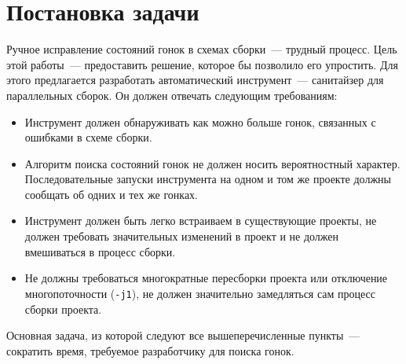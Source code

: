 \section{Постановка задачи}
\label{sec:Chapter1} 


Ручное исправление состояний гонок в схемах сборки~--- трудный процесс. Цель этой работы~--- предоставить решение, которое бы позволило его упростить. Для этого предлагается разработать автоматический инструмент~--- санитайзер для параллельных сборок. Он должен отвечать следующим требованиям:

\begin{itemize}
	\item Инструмент должен обнаруживать как можно больше гонок, связанных с ошибками в схеме сборки.
	\item Алгоритм поиска состояний гонок не должен носить вероятностный характер. Последовательные запуски инструмента на одном и том же проекте должны сообщать об одних и тех же гонках. 
	\item Инструмент должен быть легко встраиваем в существующие проекты, не должен требовать значительных изменений в проект и не должен вмешиваться в процесс сборки. 
	\item Не должны требоваться многократные пересборки проекта или отключение многопоточности (\texttt{-j1}), не должен значительно замедляться сам процесс сборки проекта.
\end{itemize}

Основная задача, из которой следуют все вышеперечисленные пункты~--- сократить время, требуемое разработчику для поиска гонок.